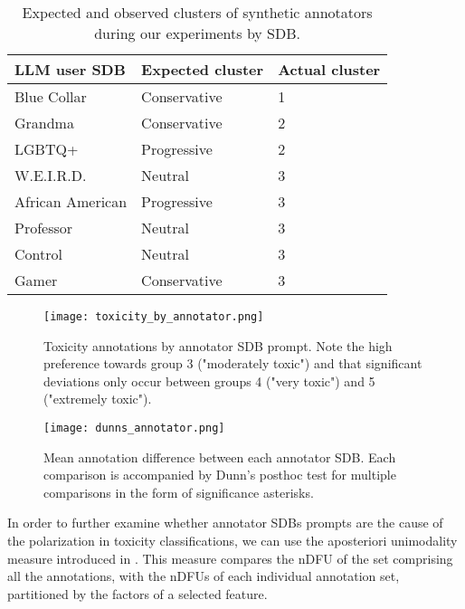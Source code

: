 \begin{table}
	\begin{tabular}
		{ |p{3cm}|p{3cm}|p{3cm}|}
		\hline
		\cellcolor{blue!25}\textbf{LLM user SDB} & \cellcolor{blue!25}\textbf{Expected cluster} & \cellcolor{blue!25}\textbf{Actual cluster}\\
		\hline
		Blue Collar & Conservative & 1 \\
		\hline
		Grandma & Conservative & 2\\
		\hline
		LGBTQ+ & Progressive & 2\\
		\hline
		\ac{W.E.I.R.D.} & Neutral & 3\\
		\hline
		African American & Progressive & 3\\
		\hline
		Professor & Neutral & 3\\
		\hline
		Control & Neutral & 3\\
		\hline
		Gamer & Conservative & 3\\
		\hline
	\end{tabular}
	\caption{Expected and observed clusters of synthetic annotators during our experiments by \ac{SDB}.}
	\label{tab:annotator-sdb-behavior}
\end{table}

\begin{figure}
	\centering
	\texttt{[image: toxicity\_by\_annotator.png]}
	\caption{Toxicity annotations by annotator \ac{SDB} prompt. Note the high preference towards group 3 ("moderately toxic") and that significant deviations only occur between groups 4 ("very toxic") and 5 ("extremely toxic").}
	\label{fig::toxicity-annotator}
\end{figure}

\begin{figure}
	\centering
	\texttt{[image: dunns\_annotator.png]}
	\caption{Mean annotation difference between each annotator \ac{SDB}. Each comparison is accompanied by Dunn's posthoc test for multiple comparisons in the form of significance asterisks.}
	\label{fig::toxicity-annotator-significance}
\end{figure}

In order to further examine whether annotator \acp{SDB} prompts are the cause of the polarization in toxicity classifications, we can use the aposteriori unimodality measure introduced in \citet{pavlopoulos-likas-2024-polarized}. This measure compares the \ac{nDFU} of the set comprising all the annotations, with the \acp{nDFU} of each individual annotation set, partitioned by the factors of a selected feature. 

